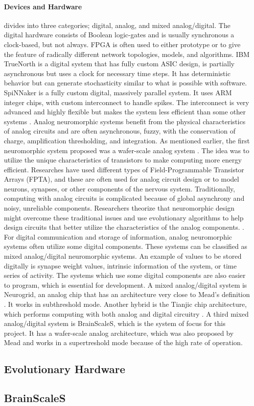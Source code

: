 \paragraph{Devices and Hardware} divides into three categories; digital, analog, and mixed analog/digital.
The digital hardware consists of Boolean logic-gates and is usually synchronous a clock-based, but not always.
FPGA is often used to either prototype or to give the feature of radically different network topologies, models, and algorithms.
IBM TrueNorth is a digital system that has fully custom ASIC design, is partially asynchronous but uses a clock for necessary time steps.
It has deterministic behavior but can generate stochasticity similar to what is possible with software.
SpiNNaker is a fully custom digital, massively parallel system.
It uses ARM integer chips, with custom interconnect to handle spikes.
The interconnect is very advanced and highly flexible but makes the system less efficient than some other systems \cite{furber_large-scale_2016} \cite{schuman_survey_2017}.
Analog neuromorphic systems benefit from the physical characteristics of analog circuits and are often asynchronous, fuzzy, with the conservation of charge, amplification thresholding, and integration.
As mentioned earlier, the first neuromorphic system proposed was a wafer-scale analog system \cite{mead_neuromorphic_1990}.
The idea was to utilize the unique characteristics of transistors to make computing more energy efficient.
Researches have used different types of Field-Programmable Transistor Arrays (FPTA), and these are often used for analog circuit design or to model neurons, synapses, or other components of the nervous system.
Traditionally, computing with analog circuits is complicated because of global asynchrony and noisy, unreliable components. Researchers theorize that neuromorphic design might overcome these traditional issues and use evolutionary algorithms to help design circuits that better utilize the characteristics of the analog components. \cite{langeheine_cmos_2001}.
For digital communication and storage of information, analog neuromorphic systems often utilize some digital components. These systems can be classified as mixed analog/digital neuromorphic systems.
An example of values to be stored digitally is synapse weight values, intrinsic information of the system, or time series of activity. The systems which use some digital components are also easier to program, which is essential for development.
A mixed analog/digital system is Neurogrid, an analog chip that has an architecture very close to Mead's definition \cite{mead_neuromorphic_1990}.
It works in subthreshold mode.
Another hybrid is the Tianjic chip architecture, which performs computing with both analog and digital circuitry \cite{pei_towards_2019}.
A third mixed analog/digital system is BrainScaleS, which is the system of focus for this project.
It has a wafer-scale analog architecture, which was also proposed by Mead \cite{mead_neuromorphic_1990} and works in a supertreshold mode because of the high rate of operation.
\cite{schuman_survey_2017}

\subsection{Evolutionary Hardware}\label{sect:eh}


\subsection{BrainScaleS}

